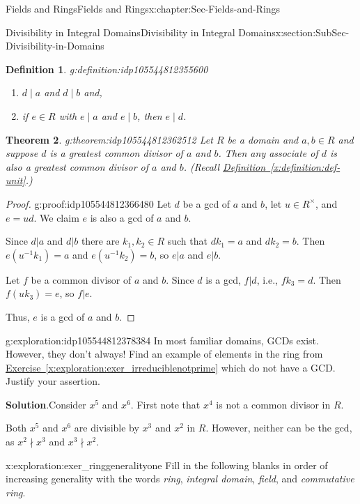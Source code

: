 \documentclass[oneside,10pt,]{book}
\newcommand{\blocktitlefont}{\relax}
\newcommand{\xreffont}{\relax}
\numberwithin{equation}{section}
\newtheorem{theorem}{Theorem}[section]
\newtheorem{definition}[theorem]{Definition}
\begin{document}
\begin{chapterptx}{Fields and Rings}{}{Fields and Rings}{}{}{x:chapter:Sec-Fields-and-Rings}
\begin{sectionptx}{Divisibility in Integral Domains}{}{Divisibility in Integral Domains}{}{}{x:section:SubSec-Divisibility-in-Domains}
\begin{definition}{}{g:definition:idp105544812355600}
\begin{enumerate}
\item{}\(d\mid a\) and \(d\mid b\) and,%
\item{}if \(e\in R\) with \(e\mid a\) and \(e\mid b\), then \(e\mid d\).%
\end{enumerate}
%
\end{definition}
\begin{theorem}{}{}{g:theorem:idp105544812362512}%
Let \(R\) be a domain and \(a,b\in R\) and suppose \(d\) is a greatest common divisor of \(a\) and \(b\). Then any associate of \(d\) is also a greatest common divisor of \(a\) and \(b\). (Recall \hyperref[x:definition:def-unit]{Definition~{\xreffont\ref{x:definition:def-unit}}}.)%
\end{theorem}
\begin{proof}{}{g:proof:idp105544812366480}
Let \(d\) be a gcd of \(a\) and \(b\), let \(u\in R^\times\), and \(e =ud\). We claim \(e\) is also a gcd of \(a\) and \(b\).%
\par
Since \(d|a\) and \(d|b\) there are \(k_1,k_2\in R\) such that \(d k_1 = a\) and \(d k_2 = b\). Then \(e (u^{-1} k_1) = a\) and \(e (u^{-1} k_2) = b\), so \(e|a\) and \(e|b\).%
\par
Let \(f\) be a common divisor of \(a\) and \(b\). Since \(d\) is a gcd, \(f|d\), i.e., \(f k_3 = d\). Then \(f (uk_3) = e\), so \(f|e\).%
\par
Thus, \(e\) is a gcd of \(a\) and \(b\).%
\end{proof}
\begin{exploration}{}{g:exploration:idp105544812378384}%
In most familiar domains, GCDs exist. However, they don't always! Find an example of elements in the ring from \hyperref[x:exploration:exer_irreduciblenotprime]{Exercise~{\xreffont\ref{x:exploration:exer_irreduciblenotprime}}} which do not have a GCD. Justify your assertion.%
\par\smallskip%
\noindent\textbf{\blocktitlefont Solution}.\hypertarget{g:solution:idp105544812379664}{}\quad{}Consider \(x^5\) and \(x^6\). First note that \(x^4\) is not a common divisor in \(R\).%
\par
Both \(x^5\) and \(x^6\) are divisible by \(x^3\) and \(x^2\) in \(R\). However, neither can be the gcd, as \(x^2\nmid x^3\) and \(x^3\nmid x^2\).%
\end{exploration}%
\begin{exploration}{}{x:exploration:exer_ringgeneralityone}%
Fill in the following blanks in order of increasing generality with the words \emph{ring}, \emph{integral domain}, \emph{field}, and \emph{commutative ring}.%

\end{exploration}
\end{sectionptx}
\end{chapterptx}
\end{document}
